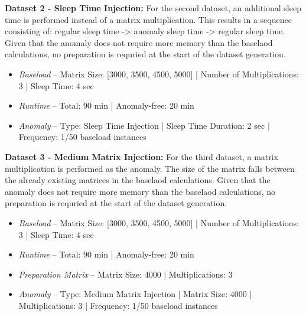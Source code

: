 \documentclass[12pt,oneside]{article}
\begin{document}
\textbf{Dataset 2 - Sleep Time Injection:} For the second dataset, an additional sleep time is performed instead of a matrix multiplication. This results in a sequence consisting of: regular sleep time -> anomaly sleep time -> regular sleep time. Given that the anomaly does not require more memory than the baselaod calculations, no preparation is requried at the start of the dataset generation.
\begin{itemize}
    \item \textit{Baseload} -- Matrix Size: [3000, 3500, 4500, 5000] | Number of Multiplications: 3 | Sleep Time: 4 sec
    \item \textit{Runtime} -- Total: 90 min | Anomaly-free: 20 min 
    \item \textit{Anomaly} -- Type: Sleep Time Injection | Sleep Time Duration: 2 sec | Frequency: 1/50 baseload instances
\end{itemize}

\textbf{Dataset 3 - Medium Matrix Injection:} For the third dataset, a matrix multiplication is performed as the anomaly. The size of the matrix falls between the already existing matrices in the baselaod calculations. Given that the anomaly does not require more memory than the baselaod calculations, no preparation is requried at the start of the dataset generation.
\begin{itemize}
    \item \textit{Baseload} -- Matrix Size: [3000, 3500, 4500, 5000] | Number of Multiplications: 3 | Sleep Time: 4 sec
    \item \textit{Runtime} -- Total: 90 min | Anomaly-free: 20 min 
    \item \textit{Preparation Matrix} -- Matrix Size: 4000 | Multiplications: 3
    \item \textit{Anomaly} -- Type: Medium Matrix Injection | Matrix Size: 4000 | Multiplications: 3 | Frequency: 1/50 baseload instances
\end{itemize}
\end{document}
